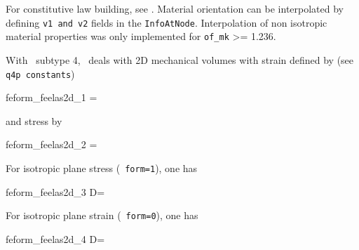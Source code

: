 For constitutive law building, see \psolid. Material orientation can be interpolated by defining {\tt v1 and v2} fields in the {\tt InfoAtNode}. Interpolation of non isotropic material properties was only implemented for {\tt of\_mk} >= 1.236.





With \melastic\ subtype 4, \psolid\ deals with 2D mechanical volumes with strain defined by (see {\tt q4p constants})

\begin{eqsvg}{feform_feelas2d_1}
=
\end{eqsvg}
%
and stress by
%
\begin{eqsvg}{feform_feelas2d_2}
=
\end{eqsvg}

For isotropic plane stress (\psolid\ {\tt form=1}), one has

\begin{eqsvg}{feform_feelas2d_3}
D=
\end{eqsvg}

For isotropic plane strain (\psolid\ {\tt form=0}), one has

\begin{eqsvg}{feform_feelas2d_4}
D=
\end{eqsvg}



